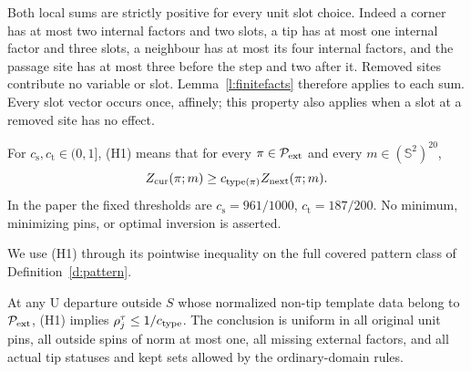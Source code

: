 Both local sums are strictly positive for every unit slot choice.
Indeed a corner has at most two internal factors and two slots,
a tip has at most one internal factor and three slots, a neighbour
has at most its four internal factors, and the passage site has
at most three before the step and two after it. Removed sites
contribute no variable or slot. Lemma~\ref{l:finitefacts}
therefore applies to each sum. Every slot vector occurs once,
affinely; this property also applies when a slot at a removed site
has no effect.

\begin{definition}[(H1)]\label{h:H1}
For \(c_{\mathrm s},c_{\mathrm t}\in(0,1]\), (H1) means that
for every \(\pi\in\mathcal P_{\rm ext}\) and every
\(m\in(\mathbb S^2)^{20}\),
\[
 Z_{\rm cur}(\pi;m)\ge c_{\rm type(\pi)}Z_{\rm next}(\pi;m).
\]
In the paper the fixed thresholds are
\(c_{\mathrm s}=961/1000\), \(c_{\mathrm t}=187/200\).
No minimum, minimizing pins, or optimal inversion is asserted.
\end{definition}

We use (H1) through its pointwise inequality on the full covered
pattern class of Definition~\ref{d:pattern}.

\begin{lemma}\label{l:local}
At any \(\mathrm U\) departure outside \(S\) whose normalized
non-tip template data belong to \(\mathcal P_{\rm ext}\), (H1)
implies \(\rho_j^\tau\le1/c_{\rm type}\).
The conclusion is uniform in all original unit pins, all outside
spins of norm at most one, all missing external factors, and all
actual tip statuses and kept sets allowed by the ordinary-domain rules.
\end{lemma}


